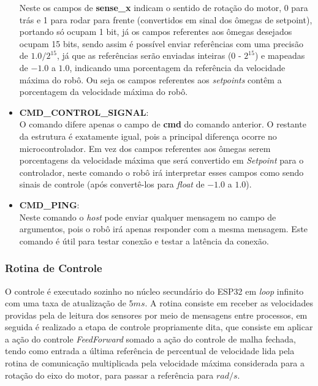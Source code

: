 \begin{itemize}
        
        
        Neste os campos de \textbf{sense\_x} indicam o sentido de rotação do motor, 0 para trás e 1 para rodar para frente (convertidos em sinal dos ômegas de setpoint), portando só ocupam 1 bit, já os campos referentes aos ômegas desejados ocupam 15 bits, sendo assim é possível enviar referências com uma precisão de $1.0/2^{15}$, já que as referências serão enviadas inteiras  (0 - $2^{15}$) e mapeadas de $-1.0$ a $1.0$, indicando uma porcentagem da referência da velocidade máxima do robô. Ou seja os campos referentes aos \textit{setpoints} contêm a porcentagem da velocidade máxima do robô.
        
    \item \textbf{CMD\_CONTROL\_SIGNAL}:\\
        
        O comando difere apenas o campo de \textbf{cmd} do comando anterior. O restante da estrutura é exatamente igual, pois a principal diferença ocorre no microcontrolador. Em vez dos campos referentes aos ômegas serem porcentagens da velocidade máxima que será convertido em \textit{Setpoint} para o controlador, neste comando o robô irá interpretar esses campos como sendo sinais de controle (após convertê-los para \emph{float} de $-1.0$ a $1.0$).
        
    \item \textbf{CMD\_PING}:\\
        Neste comando o \textit{host} pode enviar qualquer mensagem no campo de argumentos, pois o robô irá apenas responder com a mesma mensagem. Este comando é útil para testar conexão e testar a latência da conexão.
    
\end{itemize}



\subsubsection{Rotina de Controle}
O controle é executado sozinho no núcleo secundário do ESP32 em \emph{loop} infinito com uma taxa de atualização de $5ms$. A rotina consiste em receber as velocidades providas pela de leitura dos sensores por meio de mensagens entre processos, em seguida é realizado a etapa de controle propriamente dita, que consiste em aplicar a ação do controle \textit{FeedForward} somado a ação do controle de malha fechada, tendo como entrada a última referência de percentual de velocidade lida pela rotina de comunicação multiplicada pela velocidade máxima considerada para a rotação do eixo do motor, para passar a referência para $rad/s$. \\

